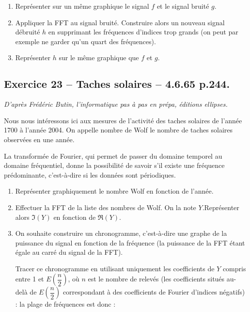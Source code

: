 \documentclass[10pt,fleqn]{article} %
\begin{document}
\begin{multicols}{2}
\begin{enumerate}
\item Représenter sur un même graphique le signal $f$ et le signal bruité $g$.
\item Appliquer la FFT au signal bruité. Construire alors un nouveau signal débruité $h$ en supprimant les fréquences d'indices trop grands (on peut par exemple ne garder qu'un quart des fréquences).
\item Représenter $h$ sur le même graphique que $f$ et $g$.
\end{enumerate}

\subsection*{Exercice 23 -- Taches solaires -- 4.6.65 p.244.}
\begin{flushright}
\textit{D'après Frédéric Butin, l'informatique pas à pas en prépa, éditions ellipses.}
\end{flushright}
Nous nous intéressons ici aux mesures de l'activité des taches solaires de l'année 1700 à l'année 2004. On appelle nombre de Wolf le nombre de taches solaires observées en une année. %

La transformée de Fourier, qui permet de passer du domaine temporel au domaine fréquentiel, donne la possibilité de savoir s'il existe une fréquence prédominante, c'est-à-dire si les données sont périodiques.

\begin{enumerate}
\item Représenter graphiquement le nombre Wolf en fonction de l'année. 
\item Effectuer la FFT de la liste des nombres de Wolf. On la note $Y$.Représenter alors $\mathfrak{I}\left(Y\right)$ en fonction de $\mathfrak{R}\left(Y\right)$.
\item On souhaite construire un chronogramme, c'est-à-dire une graphe de la puissance du signal en fonction de la fréquence (la puissance de la FFT étant égale au carré du signal de la FFT). 

Tracer ce chronogramme en utilisant uniquement les coefficients de $Y$ compris entre 1 et $E\left(\dfrac{n}{2}\right)$, où $n$ est le nombre de relevés (les coefficients situés au-delà de $E\left(\dfrac{n}{2}\right)$ correspondant à des coefficients de Fourier d'indices négatifs) : la plage de fréquences est donc :


\end{enumerate}
\end{multicols}
\end{document}
